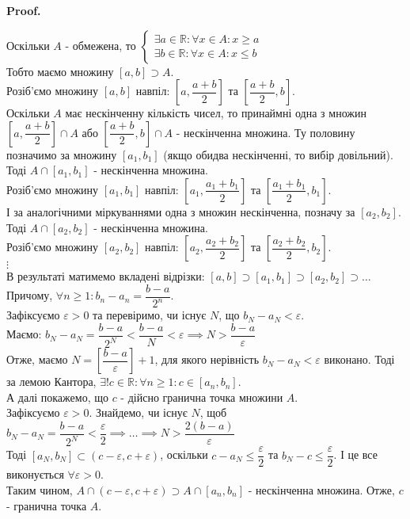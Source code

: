 \documentclass[a4paper, 14pt]{article}
\makeatletter
\def\qed{$\blacksquare$}
\theoremstyle{theoremdd}
\theoremstyle{theoremdd}
\theoremstyle{theoremdd}
\theoremstyle{theoremdd}
\theoremstyle{theoremdd}
\theoremstyle{theoremdd}
\theoremstyle{theoremdd}
\theoremstyle{theoremdd}
\renewenvironment{proof}[1][Proof.\\]{\par
\pushQED{\hfill \qed}%
\normalfont \topsep6\p@\@plus6\p@\relax
\trivlist
\item\relax
{\bfseries
#1\@addpunct{.}}\hspace\labelsep\ignorespaces
}{%
\popQED\endtrivlist\@endpefalse
}
\makeatother
\begin{document}
	\begin{proof}
	Оскільки $A$ - обмежена, то
	$\begin{cases} \exists a \in \mathbb{R}: \forall x \in A: x \geq a \\
	  \exists b \in \mathbb{R}: \forall x \in A: x \leq b \end{cases}$\\
	Тобто маємо множину $[a,b] \supset A$.\\
	Розіб'ємо множину $[a,b]$ навпіл: $\left[a, \dfrac{a+b}{2}\right]$ та $\left[\dfrac{a+b}{2},b \right]$.\\
	Оскільки $A$ має нескінченну кількість чисел, то принаймні одна з множин $\left[a, \dfrac{a+b}{2}\right] \cap A$ або $\left[\dfrac{a+b}{2}, b\right] \cap A$ - нескінченна множина. Ту половину позначимо за множину $[a_1,b_1]$ (якщо обидва нескінченні, то вибір довільний). Тоді $A \cap [a_1,b_1]$ - нескінченна множина.\\
	Розіб'ємо множину $[a_1,b_1]$ навпіл: $\left[a_1, \dfrac{a_1+b_1}{2}\right]$ та $\left[\dfrac{a_1+b_1}{2},b_1 \right]$.\\
	І за аналогічними міркуваннями одна з множин нескінченна, позначу за $[a_2,b_2]$. Тоді $A \cap [a_2,b_2]$ - нескінченна множина.\\
	Розіб'ємо множину $[a_2,b_2]$ навпіл: $\left[a_2, \dfrac{a_2+b_2}{2}\right]$ та $\left[\dfrac{a_2+b_2}{2},b_2 \right]$.\\
	$\vdots$\\
	В результаті матимемо вкладені відрізки: $[a,b] \supset [a_1,b_1] \supset [a_2,b_2] \supset \dots$\\
Причому, $\forall n \geq 1: b_n - a_n = \dfrac{b-a}{2^n}$.\\
	Зафіксуємо $\varepsilon > 0$ та перевіримо, чи існує $N$, що $b_N - a_N < \varepsilon$.\\
	Маємо: $b_N - a_N = \dfrac{b-a}{2^N} < \dfrac{b-a}{N} < \varepsilon \implies N > \dfrac{b-a}{\varepsilon}$\\
	Отже, маємо $N = \left[ \dfrac{b-a}{\varepsilon} \right]+1$, для якого нерівність $b_N-a_N < \varepsilon$ виконано. Тоді за лемою Кантора, $\exists! c \in \mathbb{R}: \forall n \geq 1: c \in [a_n,b_n]$.
	\bigskip \\
	А далі покажемо, що $c$ - дійсно гранична точка множини $A$.\\
	Зафіксуємо $\varepsilon > 0$. Знайдемо, чи існує $N$, щоб $b_N - a_N = \dfrac{b-a}{2^N} < \dfrac{\varepsilon}{2} \implies \dots \implies N > \dfrac{2(b-a)}{\varepsilon}$\\
	Тоді $[a_N,b_N] \subset (c-\varepsilon, c+\varepsilon)$, оскільки $c-a_N \leq \dfrac{\varepsilon}{2}$ та $b_N -c \leq \dfrac{\varepsilon}{2}$. І це все виконується $\forall \varepsilon > 0$.\\
	Таким чином, $A \cap (c-\varepsilon, c+\varepsilon) \supset A \cap [a_n,b_n]$ - нескінченна множина. Отже, $c$ - гранична точка $A$.
	\end{proof}
	
\end{document}
